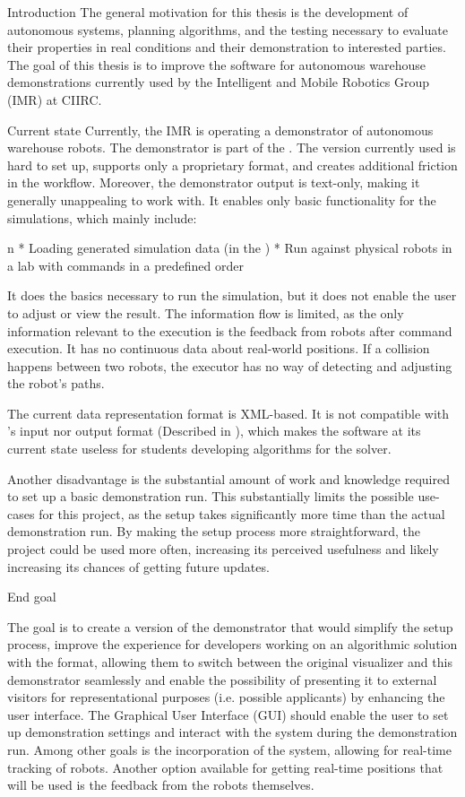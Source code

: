 \chap Introduction
The general motivation for this thesis is the development of autonomous systems, planning algorithms, and the testing necessary to evaluate their properties in real conditions and their demonstration to interested parties.
\br
\br
The goal of this thesis is to improve the software for autonomous warehouse demonstrations currently used by the Intelligent and Mobile Robotics Group (IMR) at CIIRC. 

\sec Current state
Currently, the IMR is operating a demonstrator of autonomous warehouse robots. The demonstrator is part of the {\oldRepo}. The version currently used is hard to set up, supports only a proprietary format, and creates additional friction in the workflow. Moreover, the demonstrator output is text-only, making it generally unappealing to work with. It enables only basic functionality for the simulations, which mainly include:

\begitems \style n
    * Loading generated simulation data (in the {\oldFormat})
    * Run against physical robots in a lab with commands in a predefined order
\enditems

It does the basics necessary to run the simulation, but it does not enable the user to adjust or view the result. The information flow is limited, as the only information relevant to the execution is the feedback from robots after command execution. It has no continuous data about real-world positions. If a collision happens between two robots, the executor has no way of detecting and adjusting the robot's paths.

The current data representation format is XML-based. It is not compatible with {\mapfIR}'s input nor output format (Described in {}), which makes the software at its current state useless for students developing algorithms for the {\mapfIR} solver. 

Another disadvantage is the substantial amount of work and knowledge required to set up a basic demonstration run. This substantially limits the possible use-cases for this project, as the setup takes significantly more time than the actual demonstration run. By making the setup process more straightforward, the project could be used more often, increasing its perceived usefulness and likely increasing its chances of getting future updates.

\sec End goal

The goal is to create a version of the demonstrator that would simplify the setup process, improve the experience for developers working on an algorithmic solution with the {\mapfIR} format, allowing them to switch between the original visualizer and this demonstrator seamlessly and enable the possibility of presenting it to external visitors for representational purposes (i.e. possible applicants) by enhancing the user interface.\br
The Graphical User Interface (GUI) should enable the user to set up demonstration settings and interact with the system during the demonstration run.
Among other goals is the incorporation of the {\vicon} system, allowing for real-time tracking of robots. Another option available for getting real-time positions that will be used is the feedback from the robots themselves.\br
\br

